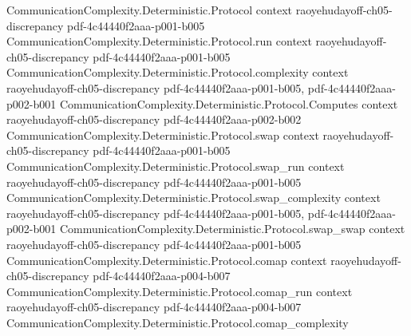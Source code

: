 \begin{lemma}
\label{CommunicationComplexity.Deterministic.Protocol.sum_indicator_leafRectangles_eq}
\leanok
{}
\proofstep
  {CommunicationComplexity.Deterministic.Protocol}
  {context}
  {raoyehudayoff-ch05-discrepancy}
  {pdf-4c44440f2aaa-p001-b005}
\proofstep
  {CommunicationComplexity.Deterministic.Protocol.run}
  {context}
  {raoyehudayoff-ch05-discrepancy}
  {pdf-4c44440f2aaa-p001-b005}
\proofstep
  {CommunicationComplexity.Deterministic.Protocol.complexity}
  {context}
  {raoyehudayoff-ch05-discrepancy}
  {pdf-4c44440f2aaa-p001-b005,
    pdf-4c44440f2aaa-p002-b001}
\proofstep
  {CommunicationComplexity.Deterministic.Protocol.Computes}
  {context}
  {raoyehudayoff-ch05-discrepancy}
  {pdf-4c44440f2aaa-p002-b002}
\proofstep
  {CommunicationComplexity.Deterministic.Protocol.swap}
  {context}
  {raoyehudayoff-ch05-discrepancy}
  {pdf-4c44440f2aaa-p001-b005}
\proofstep
  {CommunicationComplexity.Deterministic.Protocol.swap_run}
  {context}
  {raoyehudayoff-ch05-discrepancy}
  {pdf-4c44440f2aaa-p001-b005}
\proofstep
  {CommunicationComplexity.Deterministic.Protocol.swap_complexity}
  {context}
  {raoyehudayoff-ch05-discrepancy}
  {pdf-4c44440f2aaa-p001-b005,
    pdf-4c44440f2aaa-p002-b001}
\proofstep
  {CommunicationComplexity.Deterministic.Protocol.swap_swap}
  {context}
  {raoyehudayoff-ch05-discrepancy}
  {pdf-4c44440f2aaa-p001-b005}
\proofstep
  {CommunicationComplexity.Deterministic.Protocol.comap}
  {context}
  {raoyehudayoff-ch05-discrepancy}
  {pdf-4c44440f2aaa-p004-b007}
\proofstep
  {CommunicationComplexity.Deterministic.Protocol.comap_run}
  {context}
  {raoyehudayoff-ch05-discrepancy}
  {pdf-4c44440f2aaa-p004-b007}
\proofstep
  {CommunicationComplexity.Deterministic.Protocol.comap_complexity}

\end{lemma}
